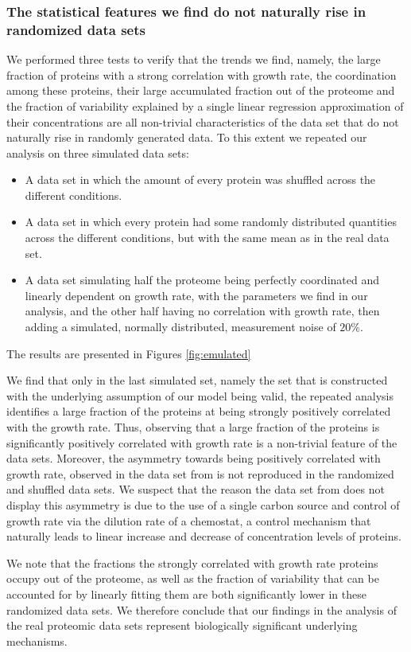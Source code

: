 \subsubsection{The statistical features we find do not naturally rise in randomized data sets}
We performed three tests to verify that the trends we find, namely, the large fraction of proteins with a strong correlation with growth rate, the coordination among these proteins, their large accumulated fraction out of the proteome and the fraction of variability explained by a single linear regression approximation of their concentrations are all non-trivial characteristics of the data set that do not naturally rise in randomly generated data.
To this extent we repeated our analysis on three simulated data sets:
\begin{itemize}
\item A data set in which the amount of every protein was shuffled across the different conditions.
\item A data set in which every protein had some randomly distributed quantities across the different conditions, but with the same mean as in the real data set.
\item A data set simulating half the proteome being perfectly coordinated and linearly dependent on growth rate, with the parameters we find in our analysis, and the other half having no correlation with growth rate, then adding a simulated, normally distributed, measurement noise of $20\%$.
\end{itemize}
The results are presented in Figures \ref{fig:emulated}

We find that only in the last simulated set, namely the set that is constructed with the underlying assumption of our model being valid, the repeated analysis identifies a large fraction of the proteins at being strongly positively correlated with the growth rate.
Thus, observing that a large fraction of the proteins is significantly positively correlated with growth rate is a non-trivial feature of the data sets.
Moreover, the asymmetry towards being positively correlated with growth rate, observed in the data set from \cite{Heinemann2015} is not reproduced in the randomized and shuffled data sets.
We suspect that the reason the data set from \cite{Valgepea} does not display this asymmetry is due to the use of a single carbon source and control of growth rate via the dilution rate of a chemostat, a control mechanism that naturally leads to linear increase and decrease of concentration levels of proteins.

We note that the fractions the strongly correlated with growth rate proteins occupy out of the proteome, as well as the fraction of variability that can be accounted for by linearly fitting them are both significantly lower in these randomized data sets.
We therefore conclude that our findings in the analysis of the real proteomic data sets represent biologically significant underlying mechanisms.